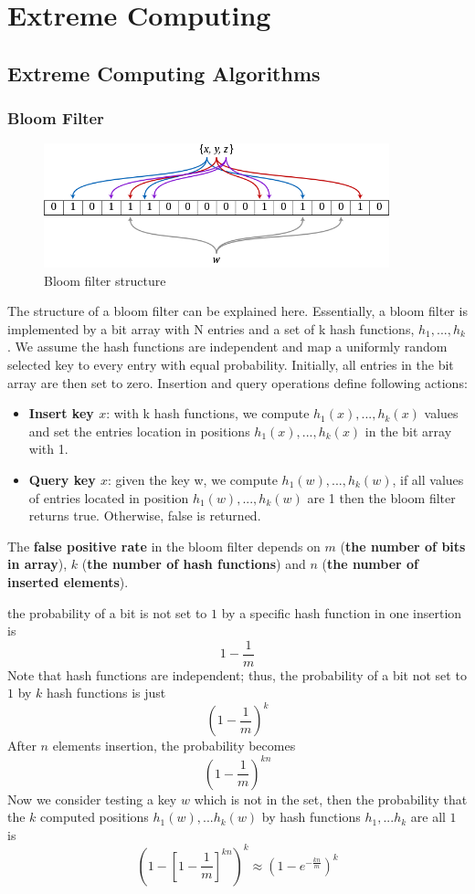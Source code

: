 \documentclass[a4paper, 12pt]{book} %
\begin{document}
\part{Extreme Computing}
\chapter{Extreme Computing Algorithms}
\section{Bloom Filter}
\begin{figure}[htpb]
	\centering
	\includegraphics[width=10cm]{figures/bloom_filter.png}
	\caption{Bloom filter structure}
	\label{fig:boat1}
\end{figure}

The structure of a bloom filter can be explained here. Essentially, a bloom filter
is implemented by a bit array with N entries and a set of k hash functions, $h_1 , ..., h_k$. We assume the hash functions are independent and map a uniformly random selected
key to every entry with equal probability. Initially, all entries in the bit array are then
set to zero. Insertion and query operations define following actions:
\begin{itemize}
	\item \textbf{Insert key $x$}: with k hash functions, we compute $ h_1(x), ..., h_k(x)$ values and
	set the entries location in positions $h_1(x), ..., h_k(x)$ in the bit array with 1.
	\item \textbf{Query key $x$}: given the key w, we compute $h_1(w), ..., h_k(w)$, if all values of entries located in position $h_1(w),...,h_k(w)$ are 1 then the bloom filter returns
	true. Otherwise, false is returned.
\end{itemize}

The \textbf{false positive rate} in the bloom filter depends on $m$ (\textbf{the number of bits in array}), $k$ (\textbf{the number of hash functions}) and $n$ (\textbf{the number of inserted elements}).

the probability of a bit is not set to $1$ by a specific hash function in one insertion is
$$1-\frac{1}{m}$$
Note that hash functions are independent; thus, the probability of a bit not set to $1$ by $k$ hash functions is just
$$(1-\frac{1}{m})^k$$
After $n$ elements insertion, the probability becomes
$$(1-\frac{1}{m})^{kn}$$
Now we consider testing a key $w$ which is not in the set, then the probability
that the $k$ computed positions $h_1(w), ...h_k(w)$ by hash functions $h_1 , ...h_k$ are all $1$ is
$$(1-[1-\frac{1}{m}]^{kn})^k \approx (1-e^{-\frac{kn}{m}})^k$$
\end{document}
